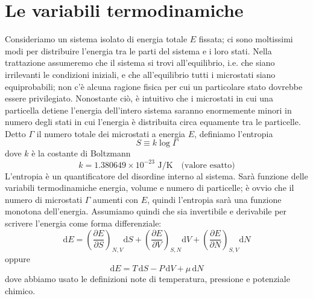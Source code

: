 \documentclass[a4paper]{report}
\begin{document}
\section{Le variabili termodinamiche}
Consideriamo un sistema isolato di energia totale $E$ fissata; ci sono moltissimi modi per distribuire l'energia tra le parti del sistema e i loro stati. Nella trattazione assumeremo che il sistema si trovi all'equilibrio, i.e. che siano irrilevanti le condizioni iniziali, e che all'equilibrio tutti i microstati siano equiprobabili; non c'è alcuna ragione fisica per cui un particolare stato dovrebbe essere privilegiato. Nonostante ciò, è intuitivo che i microstati in cui una particella detiene l'energia dell'intero sistema saranno enormemente minori in numero degli stati in cui l'energia è distribuita circa equamente tra le particelle. Detto $\Gamma$ il  numero totale dei microstati a energia $E$, definiamo l'entropia
\begin{equation}
    S \equiv k \log\Gamma
    \label{entropia}
\end{equation}
dove $k$ è la costante di Boltzmann
\begin{equation}
    k = 1.380649 \times 10^{-23} \,\,\text{J/K} \quad \text{(valore esatto)}
\end{equation}
L'entropia è un quantificatore del disordine interno al sistema. Sarà funzione delle variabili termodinamiche energia, volume e numero di particelle; è ovvio che il numero di microstati $\Gamma$ aumenti con $E$, quindi l'entropia sarà una funzione monotona dell'energia. Assumiamo quindi che sia invertibile e derivabile per scrivere l'energia come forma differenziale:
\begin{equation}
    \mathrm{d}E = \left(\frac{\partial E}{\partial S}\right)_{N,V}\mathrm{d}S + \left(\frac{\partial E}{\partial V}\right)_{S,N}\mathrm{d}V +\left(\frac{\partial E}{\partial N}\right)_{S,V}\mathrm{d}N
\end{equation}
oppure
\begin{equation}
    \mathrm{d}E = T\,\mathrm{d}S - P\,\mathrm{d}V +\mu\,\mathrm{d}N
    \label{denergia}
\end{equation}
dove abbiamo usato le definizioni note di temperatura, pressione e potenziale chimico.
\end{document}
